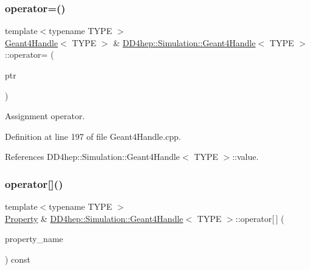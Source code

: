 \hypertarget{class_d_d4hep_1_1_simulation_1_1_geant4_handle_ab249ffa125a4a3460135843a2fd83a75}{}\label{class_d_d4hep_1_1_simulation_1_1_geant4_handle_ab249ffa125a4a3460135843a2fd83a75} 
\subsubsection{\texorpdfstring{operator=()}{operator=()}\hspace{0.1cm}{\footnotesize\ttfamily [2/2]}}
{\footnotesize\ttfamily template$<$typename T\+Y\+PE $>$ \\
\hyperlink{class_d_d4hep_1_1_simulation_1_1_geant4_handle}{Geant4\+Handle}$<$ T\+Y\+PE $>$ \& \hyperlink{class_d_d4hep_1_1_simulation_1_1_geant4_handle}{D\+D4hep\+::\+Simulation\+::\+Geant4\+Handle}$<$ T\+Y\+PE $>$\+::operator= (\begin{DoxyParamCaption}\item[{\hyperlink{class_d_d4hep_1_1_simulation_1_1_geant4_handle_a35e583b9228e38c95d23112ad19b645d}{handled\+\_\+type} $\ast$}]{ptr }\end{DoxyParamCaption})}



Assignment operator. 



Definition at line 197 of file Geant4\+Handle.\+cpp.



References D\+D4hep\+::\+Simulation\+::\+Geant4\+Handle$<$ T\+Y\+P\+E $>$\+::value.

\hypertarget{class_d_d4hep_1_1_simulation_1_1_geant4_handle_ab844fdd7f6360704163c3ebf3381f651}{}\label{class_d_d4hep_1_1_simulation_1_1_geant4_handle_ab844fdd7f6360704163c3ebf3381f651} 
\subsubsection{\texorpdfstring{operator[]()}{operator[]()}}
{\footnotesize\ttfamily template$<$typename T\+Y\+PE $>$ \\
\hyperlink{class_d_d4hep_1_1_property}{Property} \& \hyperlink{class_d_d4hep_1_1_simulation_1_1_geant4_handle}{D\+D4hep\+::\+Simulation\+::\+Geant4\+Handle}$<$ T\+Y\+PE $>$\+::operator\mbox{[}$\,$\mbox{]} (\begin{DoxyParamCaption}\item[{const std\+::string \&}]{property\+\_\+name }\end{DoxyParamCaption}) const}



